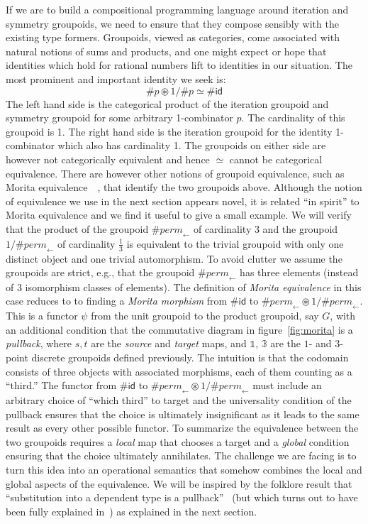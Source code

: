 \documentclass[a4paper,USenglish]{lipics-v2016-utf8x}
\newcommand{\hash}{\#}
\newcommand{\order}[1]{\hash #1}
\newcommand{\iorder}[1]{1/\hash #1}
\newcommand{\ot}{\mathbb{1}}
\newcommand{\permfive}{\mathit{perm}_{\leftarrow}}
\newcommand{\idiso}{\mathsf{{id}}}
\begin{document}
If we are to build a compositional programming language around iteration and
symmetry groupoids, we need to ensure that they compose sensibly with the
existing type formers. Groupoids, viewed as categories, come associated with
natural notions of sums and products, and one might expect or hope that
identities which hold for rational numbers lift to identities in our
situation. The most prominent and important identity we seek is:
\[
\order{p} \circledast \iorder{p} \simeq \order{\idiso}
\]
The left hand side is the categorical product of the iteration groupoid and
symmetry groupoid for some arbitrary 1-combinator $p$. The cardinality of this
groupoid is 1. The right hand side is the iteration groupoid for the identity
1-combinator which also has cardinality 1. The groupoids on either side are
however not categorically equivalent and hence $\simeq$ cannot be categorical
equivalence.  There are however other notions of groupoid equivalence, such as
Morita equivalence~\cite[C5.3]{johnstone2002sketches}~\cite{looping}, that
identify the two groupoids above.  Although the notion of equivalence we use in
the next section appears novel, it is related ``in spirit'' to Morita
equivalence and we find it useful to give a small example. We will verify that
the product of the groupoid $\order{\permfive}$ of cardinality 3 and the
groupoid $\iorder{\permfive}$ of cardinality $\frac{1}{3}$ is equivalent to the
trivial groupoid with only one distinct object and one trivial automorphism. To
avoid clutter we assume the groupoids are strict, e.g., that the groupoid
$\order{\permfive}$ has three elements (instead of 3 isomorphism classes of
elements). The definition of \emph{Morita equivalence} in this case reduces to
to finding a \emph{Morita morphism} from $\order{\idiso}$ to
$\order{\permfive} \circledast \iorder{\permfive}$. This is a functor $\psi$
from the unit groupoid to the product groupoid, say $G$, with an additional
condition that the commutative diagram in figure~\ref{fig:morita} is a
\emph{pullback}, where $s,t$ are the \emph{source} and \emph{target} maps, and
$\ot$, $\mathbb{3}$ are the $1$- and $3$-point discrete groupoids defined
previously.  The intuition is that the codomain consists of three objects with
associated morphisms, each of them counting as a ``third.'' The functor from
$\order{\idiso}$ to $\order{\permfive} \circledast \iorder{\permfive}$ must
include an arbitrary choice of ``which third'' to target and the universality
condition of the pullback ensures that the choice is ultimately insignificant as
it leads to the same result as every other possible functor. To summarize the
equivalence between the two groupoids requires a \emph{local} map that chooses a
target and a \emph{global} condition ensuring that the choice ultimately
annihilates. The challenge we are facing is to turn this idea into an
operational semantics that somehow combines the local and global aspects of the
equivalence. We will be inspired by the folklore result that ``substitution into
a dependent type is a pullback''~\cite{subpullback} (but which turns out to have
been fully explained in~\cite{practicalfoundations}) as explained in the next
section.
\end{document}
